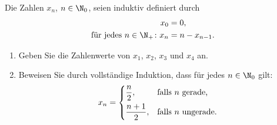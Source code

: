 \documentclass[12pt]{article}
\begin{document}


\begin{aufgabe}[2 + 4 = 6]
  Die Zahlen $x_n$, $n \in \N_0$, seien induktiv definiert durch
  \begin{align*}
    x_0 &= 0,\\
    \text{für jedes } n \in \N_+ \colon x_n &= n - x_{n - 1}.
  \end{align*}
  \begin{enumerate}
    \item Geben Sie die Zahlenwerte von $x_1$, $x_2$, $x_3$ und $x_4$ an.
    \item Beweisen Sie durch vollständige Induktion, dass für jedes
          $n \in \N_0$ gilt:
          \begin{equation*}
            x_n = \begin{dcases*}
                    \frac{n}{2},     &falls $n$ gerade,\\
                    \frac{n + 1}{2}, &falls $n$ ungerade.
                  \end{dcases*}
          \end{equation*}
  \end{enumerate}
\end{aufgabe}
\end{document}
